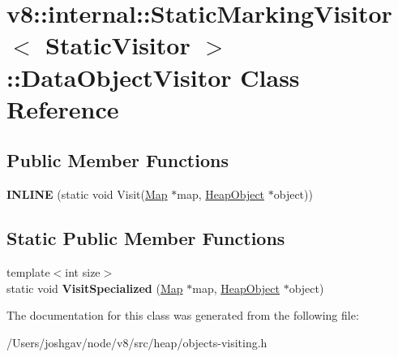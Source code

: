 \hypertarget{classv8_1_1internal_1_1_static_marking_visitor_1_1_data_object_visitor}{}\section{v8\+:\+:internal\+:\+:Static\+Marking\+Visitor$<$ Static\+Visitor $>$\+:\+:Data\+Object\+Visitor Class Reference}
\label{classv8_1_1internal_1_1_static_marking_visitor_1_1_data_object_visitor}
\subsection*{Public Member Functions}
\begin{DoxyCompactItemize}
\item 
{\bfseries I\+N\+L\+I\+NE} (static void Visit(\hyperlink{classv8_1_1internal_1_1_map}{Map} $\ast$map, \hyperlink{classv8_1_1internal_1_1_heap_object}{Heap\+Object} $\ast$object))\hypertarget{classv8_1_1internal_1_1_static_marking_visitor_1_1_data_object_visitor_aeb82fd5942b87896022db90a2e06d543}{}\label{classv8_1_1internal_1_1_static_marking_visitor_1_1_data_object_visitor_aeb82fd5942b87896022db90a2e06d543}

\end{DoxyCompactItemize}
\subsection*{Static Public Member Functions}
\begin{DoxyCompactItemize}
\item 
{\footnotesize template$<$int size$>$ }\\static void {\bfseries Visit\+Specialized} (\hyperlink{classv8_1_1internal_1_1_map}{Map} $\ast$map, \hyperlink{classv8_1_1internal_1_1_heap_object}{Heap\+Object} $\ast$object)\hypertarget{classv8_1_1internal_1_1_static_marking_visitor_1_1_data_object_visitor_a31ca0f503f0184f18568a3f10a8e6ca3}{}\label{classv8_1_1internal_1_1_static_marking_visitor_1_1_data_object_visitor_a31ca0f503f0184f18568a3f10a8e6ca3}

\end{DoxyCompactItemize}


The documentation for this class was generated from the following file\+:\begin{DoxyCompactItemize}
\item 
/\+Users/joshgav/node/v8/src/heap/objects-\/visiting.\+h\end{DoxyCompactItemize}
